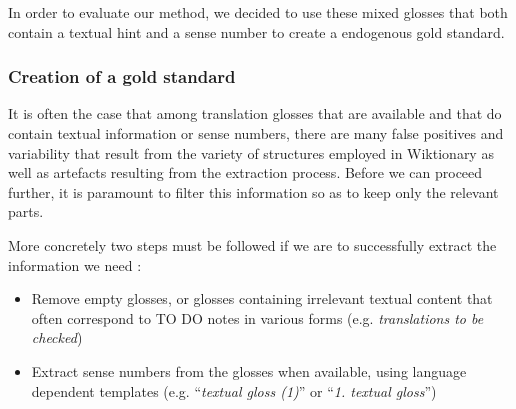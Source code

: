 \documentclass[10pt, a4paper]{article}
\begin{document}
In order to evaluate our method, we decided to use these mixed glosses that both contain a textual hint and a sense number to create a endogenous gold standard.

\subsubsection{Creation of a gold standard}

It is often the case that among translation glosses that are available and that do contain textual information or sense numbers, there are many false positives and variability that result from the variety of structures employed in Wiktionary as well as artefacts resulting from the extraction process. Before we can proceed further, it is paramount to filter this information so as to keep only the relevant parts. 

More concretely two steps must be followed if we are to successfully extract the information we need :
\begin{itemize}
   \item Remove empty glosses, or glosses containing irrelevant textual content that often correspond to TO DO notes in various forms (e.g. \emph{translations to be checked})
   \item Extract sense numbers from the glosses when available, using language dependent templates (e.g. ``\emph{textual gloss (1)}'' or ``\emph{1. textual gloss}'') 
\end{itemize}
\end{document}
